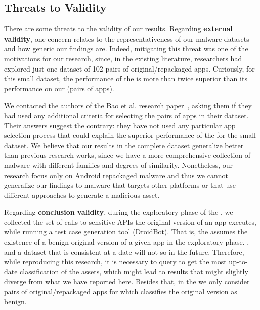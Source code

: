 \subsection{Threats to Validity}\label{sec:threats}


There are some threats to the validity of our results.
Regarding {\bf external validity}, one concern relates to the 
representativeness of our malware datasets and how generic our findings are.
Indeed, mitigating this threat was one of the motivations for our research,
since, in the existing literature, researchers had explored just
one dataset of 102 pairs of original/repackaged apps. Curiously,
for this small dataset, the performance of the
\mas is more than twice superior
than its performance on our \cds (\apps pairs of
apps).

We contacted the authors of the Bao et al. research paper~\cite{DBLP:conf/wcre/BaoLL18}, asking them
if they had used any additional criteria for selecting the pairs of apps in their
dataset. Their answers suggest the contrary: they have not used
any particular app selection process that
could explain the superior performance of the \mas for the small dataset. We believe that
our results in the complete dataset generalize better than previous research works,
since we have a more comprehensive collection of malware with different
families and degrees of similarity. Nonetheless, our
research focus only on Android repackaged malware and thus we cannot generalize
our findings to malware that targets other platforms or that use different approaches
to generate a malicious asset.

Regarding {\bf conclusion validity}, during the exploratory phase of the \mas, we collected the set of calls to sensitive APIs the original version of
an app executes, while running a test case generation tool (DroidBot).
That is, the \mas assumes the existence of a benign original
version of a given app in the exploratory phase. , and a dataset that is consistent at a date will not so in the future.
Therefore, while reproducing this research, it is necessary to query \vt to get the most up-to-date classification of the assets, which might lead to results that might slightly
diverge from what we have reported here. Besides that, in the \cds we only consider
pairs of original/repackaged apps for which \vt classifies the original version as benign. 

